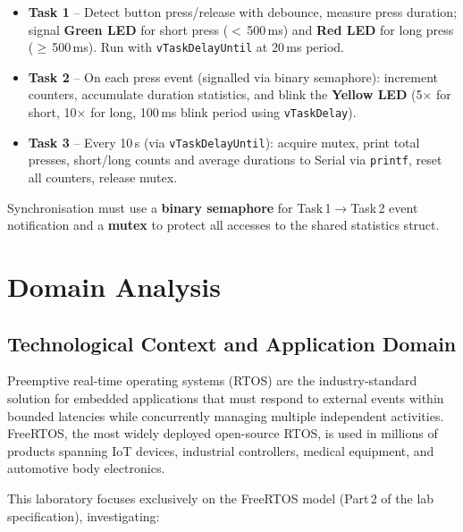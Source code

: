 \documentclass[12pt]{article}
\begin{document}
\begin{itemize}
    \item \textbf{Task 1} -- Detect button press/release with debounce, measure press duration; signal \textbf{Green LED} for short press ($<$\,500\,ms) and \textbf{Red LED} for long press ($\geq$\,500\,ms). Run with \texttt{vTaskDelayUntil} at 20\,ms period.
    \item \textbf{Task 2} -- On each press event (signalled via binary semaphore): increment counters, accumulate duration statistics, and blink the \textbf{Yellow LED} (5$\times$ for short, 10$\times$ for long, 100\,ms blink period using \texttt{vTaskDelay}).
    \item \textbf{Task 3} -- Every 10\,s (via \texttt{vTaskDelayUntil}): acquire mutex, print total presses, short/long counts and average durations to Serial via \texttt{printf}, reset all counters, release mutex.
\end{itemize}

Synchronisation must use a \textbf{binary semaphore} for Task\,1$\rightarrow$Task\,2 event notification and a \textbf{mutex} to protect all accesses to the shared statistics struct.

\section{Domain Analysis}

\subsection{Technological Context and Application Domain}
\hspace{0.8cm} Preemptive real-time operating systems (RTOS) are the industry-standard solution for embedded applications that must respond to external events within bounded latencies while concurrently managing multiple independent activities. FreeRTOS, the most widely deployed open-source RTOS, is used in millions of products spanning IoT devices, industrial controllers, medical equipment, and automotive body electronics.

This laboratory focuses exclusively on the FreeRTOS model (Part\,2 of the lab specification), investigating:
\end{document}
